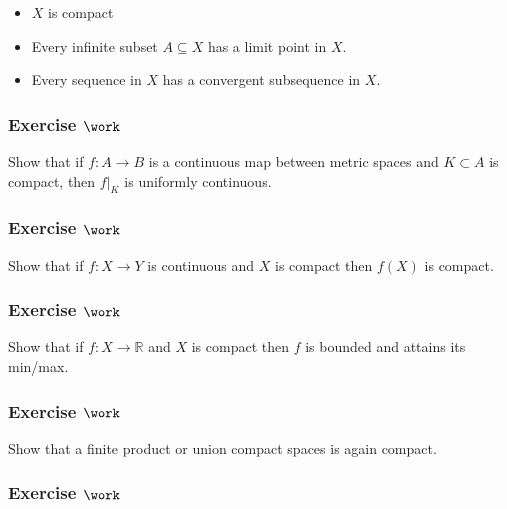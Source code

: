 \begin{itemize}
\tightlist
\item
  \(X\) is compact
\item
  Every infinite subset \(A\subseteq X\) has a limit point in \(X\).
\item
  Every sequence in \(X\) has a convergent subsequence in \(X\).
\end{itemize}

\hypertarget{exercise-work-14}{%
\subsubsection{\texorpdfstring{Exercise
\(\work\)}{Exercise \textbackslash work}}\label{exercise-work-14}}

Show that if \(f: A\to B\) is a continuous map between metric spaces and
\(K\subset A\) is compact, then \({\left.{{f}} \right|_{{K}} }\) is
uniformly continuous.

\hypertarget{exercise-work-15}{%
\subsubsection{\texorpdfstring{Exercise
\(\work\)}{Exercise \textbackslash work}}\label{exercise-work-15}}

Show that if \(f:X\to Y\) is continuous and \(X\) is compact then
\(f(X)\) is compact.

\hypertarget{exercise-work-16}{%
\subsubsection{\texorpdfstring{Exercise
\(\work\)}{Exercise \textbackslash work}}\label{exercise-work-16}}

Show that if \(f:X\to {\mathbb{R}}\) and \(X\) is compact then \(f\) is
bounded and attains its min/max.

\hypertarget{exercise-work-17}{%
\subsubsection{\texorpdfstring{Exercise
\(\work\)}{Exercise \textbackslash work}}\label{exercise-work-17}}

Show that a finite product or union compact spaces is again compact.

\hypertarget{exercise-work-18}{%
\subsubsection{\texorpdfstring{Exercise
\(\work\)}{Exercise \textbackslash work}}\label{exercise-work-18}}

